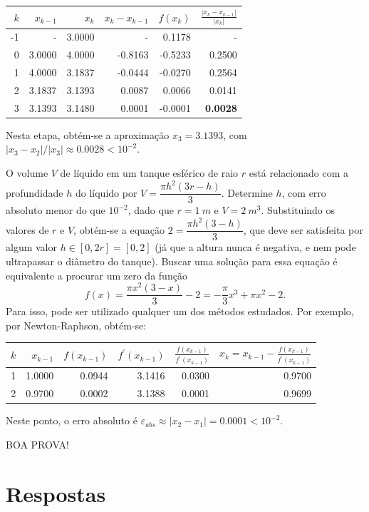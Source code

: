 \documentclass[12pt,a4paper]{article}
\begin{document}
\begin{ExerciseList}
\begin{center}
\begin{tabular}{|r|r|r|r|r|r|}
\hline
$k$ & $x_{k-1}$ & $x_k$ & $x_k - x_{k-1}$ & $f(x_k)$ & $\frac{|x_k - x_{k-1}|}{|x_k|}$ \\
\hline
-1 &      - & 3.0000 & -       &  0.1178 & - \\
\hline
 0 & 3.0000 & 4.0000 & -0.8163 & -0.5233 & 0.2500 \\
\hline
 1 & 4.0000 & 3.1837 & -0.0444 & -0.0270 & 0.2564 \\
\hline
 2 & 3.1837 & 3.1393 &  0.0087 &  0.0066 & 0.0141 \\
\hline
 3 & 3.1393 & 3.1480 &  0.0001 & -0.0001 & \textbf{0.0028} \\
\hline
\end{tabular}
\end{center}
\medskip
Nesta etapa, obtém-se a aproximação $x_3 = 3.1393$, com $|x_3 - x_2| / |x_3| \approx 0.0028 < 10^{-2}$.

\Exercise[title={2,5}]
O volume $V$ de líquido em um tanque esférico de raio $r$ está relacionado com a profundidade $h$ do líquido por $V = \dfrac{\pi h^2(3r-h)}{3}$. Determine $h$, com erro absoluto menor do que $10^{-2}$, dado que $r=1\ m$ e $V = 2\ m^3$.
\Answer Substituindo os valores de $r$ e $V$, obtém-se a equação
$2 = \dfrac{\pi h^2(3-h)}{3}$, que deve ser satisfeita por algum valor $h \in [0, 2r] = [0, 2]$ (já que a altura nunca é negativa, e nem pode ultrapassar o diâmetro do tanque). Buscar uma solução para essa equação é equivalente a procurar um zero da função
\[
f(x)
= \dfrac{\pi x^2(3-x)}{3} - 2
= -\dfrac{\pi}{3}x^3 + \pi x^2 - 2.
\]
Para isso, pode ser utilizado qualquer um dos métodos estudados. Por exemplo, por Newton-Raphson, obtém-se:
\begin{center}
\begin{tabular}{|r|r|r|r|r|r|}
\hline
$k$ &  $x_{k-1}$ & $f(x_{k-1})$ & $f^\prime(x_{k-1})$ & $\frac{f(x_{k-1})}{f^\prime(x_{k-1})}$ & $x_k = x_{k-1} - \frac{f(x_{k-1})}{f^\prime(x_{k-1})}$ \\
\hline
1 & 1.0000 & 0.0944 & 3.1416 & 0.0300 & 0.9700 \\
\hline
2 & 0.9700 & 0.0002 & 3.1388 & 0.0001 & 0.9699 \\
\hline
\end{tabular}
\end{center}
Neste ponto, o erro absoluto é $\varepsilon_{abs} \approx |x_2 - x_1| = 0.0001 < 10^{-2}$.
\end{ExerciseList}

\vspace{0.5cm}
\begin{center}
BOA PROVA!
\end{center}

\newpage
\restoregeometry
\section*{Respostas}
\shipoutAnswer
\end{document}
